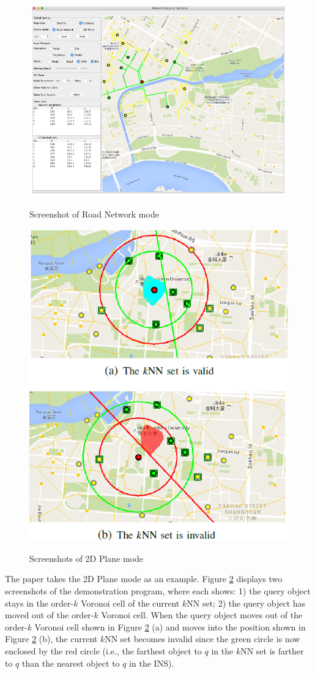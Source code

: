 \documentclass[paper=a4, fontsize=18pt]{article} %
\numberwithin{equation}{section} %
\numberwithin{figure}{section} %
\numberwithin{table}{section} %
\begin{document}
\begin{figure}[h]
  \centering
  \includegraphics[width=.7\linewidth]{9_12_kNN1.png}\\
  \caption{Screenshot of Road Network mode}\label{fig:INSQ1}
\end{figure}
\begin{figure}[h]
  \centering
  \includegraphics[width=.4\linewidth]{9_12_kNN2.png}\\
  \caption{Screenshots of 2D Plane mode}\label{fig:INSQ2}
\end{figure}

The paper takes the 2D Plane mode as an example. Figure \ref{fig:INSQ2} displays two screenshots of the demonstration program, where each shows: 1) the query object stays in the order-$k$ Voronoi cell of the current $k$NN set; 2) the query object has moved out of the order-$k$ Voronoi cell. When the query object moves out of the order-$k$ Voronoi cell shown in Figure \ref{fig:INSQ2} (a) and moves into the position shown in Figure \ref{fig:INSQ2} (b), the current $k$NN set becomes invalid since the green circle is now enclosed by the red circle (i.e., the farthest object to $q$ in the $k$NN set is farther to $q$ than the nearest object to $q$ in the INS).
\end{document}
